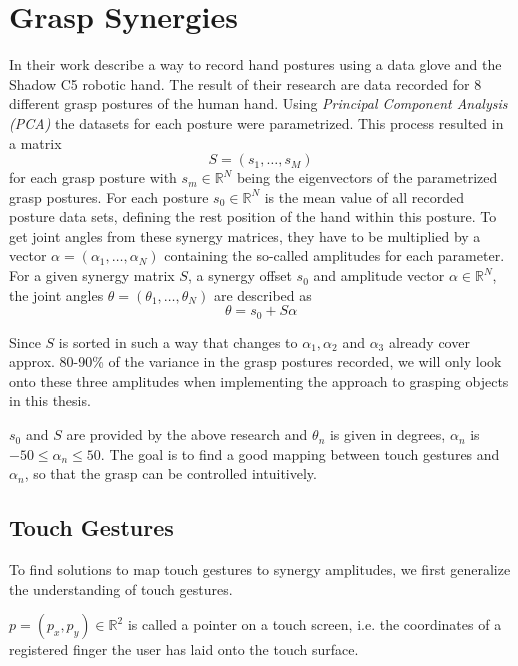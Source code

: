 \section{Grasp Synergies}
\label{sec:conc:synergy}
In their work \citeauthor{Bernardino2013} \cite{Bernardino2013} describe a way to record hand postures using a data glove and the Shadow C5 robotic hand. The result of their research are data recorded for 8 different grasp postures of the human hand. Using \textit{Principal Component Analysis (PCA)} the datasets for each posture were parametrized. This process resulted in a matrix 
\begin{equation*}
S = (s_1, \dots , s_M)
\end{equation*}
for each grasp posture with $s_m \in \mathbb{R}^N$ being the eigenvectors of the parametrized grasp postures. For each posture $s_0 \in \mathbb{R}^N$ is the mean value of all recorded posture data sets, defining the rest position of the hand within this posture. To get joint angles from these synergy matrices, they have to be multiplied by a vector $\alpha = (\alpha_1, \dots , \alpha_N)$ containing the so-called amplitudes for each parameter. For a given synergy matrix $S$, a synergy offset $s_0$ and amplitude vector $\alpha \in \mathbb{R}^N$, the joint angles $\theta = (\theta_1, \dots , \theta_N)$ are described as
\begin{equation}
\label{eq:syn}
\theta = s_0 + S\alpha
\end{equation}

Since $S$ is sorted in such a way that changes to $\alpha_1, \alpha_2$ and $\alpha_3$ already cover approx. 80-90\% of the variance in the grasp postures recorded\cite{Bernardino2013}, we will only look onto these three amplitudes when implementing the approach to grasping objects in this thesis.

$s_0$ and $S$ are provided by the above research and $\theta_n$ is given in degrees, $\alpha_n$ is $-50 \leq \alpha_n \leq 50$. The goal is to find a good mapping between touch gestures and $\alpha_n$, so that the grasp can be controlled intuitively.

\subsection{Touch Gestures}
\label{sec:conc:gestures}
To find solutions to map touch gestures to synergy amplitudes, we first generalize the understanding of touch gestures.

\begin{defn}
$p = (p_x, p_y) \in \mathbb{R}^2$ is called a pointer on a touch screen, i.e. the coordinates of a registered finger the user has laid onto the touch surface.
\end{defn}

